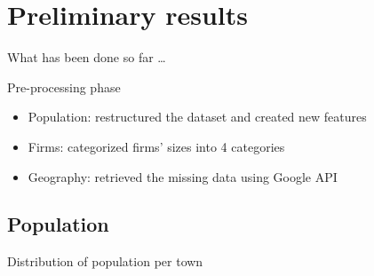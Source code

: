 \documentclass[12pt]{beamer}
\begin{document}
\section{Preliminary results}


\begin{frame}
	\centerline{\Huge\textcolor{bscuro}{What has been done so far \ldots}}		
\end{frame}


\begin{frame}{\textcolor{bscuro}{Pre-processing phase}}
	\begin{itemize}
		\item Population: restructured the dataset and created new features
		\item Firms: categorized firms' sizes into 4 categories
		\item Geography: retrieved the missing data using Google API
	\end{itemize}
\end{frame}


\subsection{Population}


\begin{frame}{\textcolor{bscuro}{Distribution of population per town}}
	\begin{figure}[!ht] 
		\centering
	\end{figure}
\end{frame}
\end{document}
